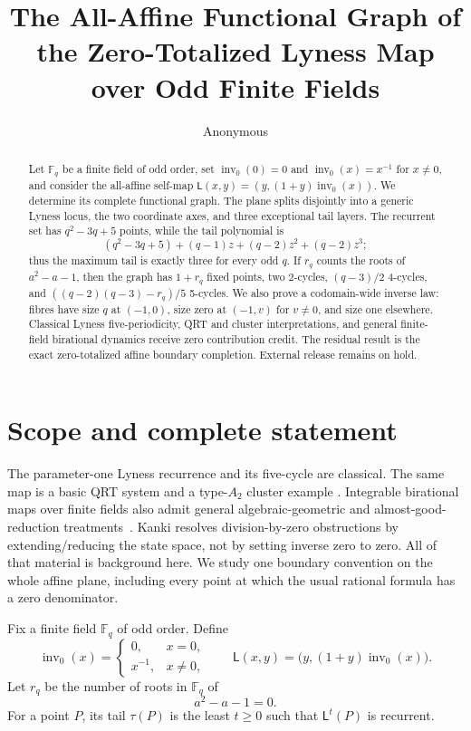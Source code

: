 \documentclass[10pt,a4paper]{amsart}
\title[Zero-totalized Lyness dynamics]{The All-Affine Functional Graph of the
Zero-Totalized Lyness Map over Odd Finite Fields}
\author{Anonymous}
\date{}
\theoremstyle{definition}
\theoremstyle{remark}
\newcommand{\F}{\mathbb F}
\newcommand{\Lyn}{\mathsf L}
\newcommand{\invz}{\operatorname{inv}_0}
\begin{document}
\begin{abstract}
Let $\F_q$ be a finite field of odd order, set $\invz(0)=0$ and
$\invz(x)=x^{-1}$ for $x\ne0$, and consider the all-affine self-map
$\Lyn(x,y)=(y,(1+y)\invz(x))$.  We determine its complete functional graph.
The plane splits disjointly into a generic Lyness locus, the two coordinate
axes, and three exceptional tail layers.  The recurrent set has
$q^2-3q+5$ points, while the tail polynomial is
\[
 (q^2-3q+5)+(q-1)z+(q-2)z^2+(q-2)z^3;
\]
thus the maximum tail is exactly three for every odd $q$.  If $r_q$ counts
the roots of $a^2-a-1$, then the graph has $1+r_q$ fixed points, two
2-cycles, $(q-3)/2$ 4-cycles, and
$((q-2)(q-3)-r_q)/5$ 5-cycles.  We also prove a codomain-wide inverse law:
fibres have size $q$ at $(-1,0)$, size zero at $(-1,v)$ for $v\ne0$, and
size one elsewhere.  Classical Lyness five-periodicity, QRT and cluster
interpretations, and general finite-field birational dynamics receive zero
contribution credit.  The residual result is the exact zero-totalized affine
boundary completion.  External release remains on hold.
\end{abstract}

\maketitle

\section{Scope and complete statement}

The parameter-one Lyness recurrence and its five-cycle are classical.  The
same map is a basic QRT system and a type-$A_2$ cluster example
\citep{Lyness1942,HoneKouloukas2023,Hone2020}.  Integrable birational maps
over finite fields also admit general algebraic-geometric and
almost-good-reduction treatments~\citep{JogiaRobertsVivaldi2006,Kanki2013}.
Kanki resolves division-by-zero obstructions by extending/reducing the state
space, not by setting inverse zero to zero.  All of that material is
background here.
We study one boundary convention on the whole affine plane, including every
point at which the usual rational formula has a zero denominator.

Fix a finite field $\F_q$ of odd order.  Define
\begin{equation}\label{eq:invzero}
 \invz(x)=
 \begin{cases}
 0,&x=0,\\
 x^{-1},&x\ne0,
 \end{cases}
 \qquad
 \Lyn(x,y)=\bigl(y,(1+y)\invz(x)\bigr).
\end{equation}
Let $r_q$ be the number of roots in $\F_q$ of
\begin{equation}\label{eq:fixed-polynomial}
 a^2-a-1=0.
\end{equation}
For a point $P$, its tail $\tau(P)$ is the least $t\geq0$ such that
$\Lyn^t(P)$ is recurrent.
\end{document}
